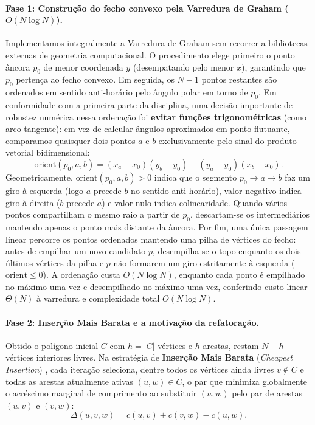 \paragraph{Fase 1: Construção do fecho convexo pela Varredura de Graham ($O(N \log N)$).}
Implementamos integralmente a Varredura de Graham \cite{graham1972efficient} sem recorrer a
bibliotecas externas de geometria computacional. O procedimento elege primeiro o ponto âncora
$p_0$ de menor coordenada $y$ (desempatando pelo menor $x$), garantindo que $p_0$ pertença ao
fecho convexo. Em seguida, os $N - 1$ pontos restantes são ordenados em sentido anti-horário
pelo ângulo polar em torno de $p_0$. Em conformidade com a primeira parte da disciplina, 
uma decisão importante de robustez numérica nessa
ordenação foi \textbf{evitar funções trigonométricas} (como arco-tangente): em vez de calcular
ângulos aproximados em ponto flutuante, comparamos quaisquer dois pontos $a$ e $b$
exclusivamente pelo sinal do produto vetorial bidimensional:
\begin{equation}
  \text{orient}(p_0, a, b) = (x_a - x_0)(y_b - y_0) - (y_a - y_0)(x_b - x_0).
  \label{eq:cross_product}
\end{equation}
Geometricamente, $\text{orient}(p_0, a, b) > 0$ indica que o segmento $p_0 \to a \to b$ faz um
giro à esquerda (logo $a$ precede $b$ no sentido anti-horário), valor negativo indica giro à
direita ($b$ precede $a$) e valor nulo indica colinearidade. Quando vários pontos compartilham
o mesmo raio a partir de $p_0$, descartam-se os intermediários mantendo apenas o ponto mais
distante da âncora. Por fim, uma única passagem linear percorre os pontos ordenados mantendo uma
pilha de vértices do fecho: antes de empilhar um novo candidato $p$, desempilha-se o topo
enquanto os dois últimos vértices da pilha e $p$ não formarem um giro estritamente à esquerda
($\text{orient} \le 0$). A ordenação custa $O(N \log N)$, enquanto cada ponto é empilhado no
máximo uma vez e desempilhado no máximo uma vez, conferindo custo linear $\Theta(N)$ à
varredura e complexidade total $O(N \log N)$.

\paragraph{Fase 2: Inserção Mais Barata e a motivação da refatoração.}
Obtido o polígono inicial $C$ com $h = |C|$ vértices e $h$ arestas, restam $N - h$ vértices
interiores livres. Na estratégia de \textbf{Inserção Mais Barata} (\textit{Cheapest Insertion})
\cite{rosenkrantz1977analysis}, cada iteração seleciona, dentre todos os vértices ainda livres
$v \notin C$ e todas as arestas atualmente ativas $(u, w) \in C$, o par que minimiza
globalmente o acréscimo marginal de comprimento ao substituir $(u, w)$ pelo par de arestas
$(u, v)$ e $(v, w)$:
\begin{equation}
  \Delta(u, v, w) = c(u, v) + c(v, w) - c(u, w).
  \label{eq:cheapest_delta}
\end{equation}

